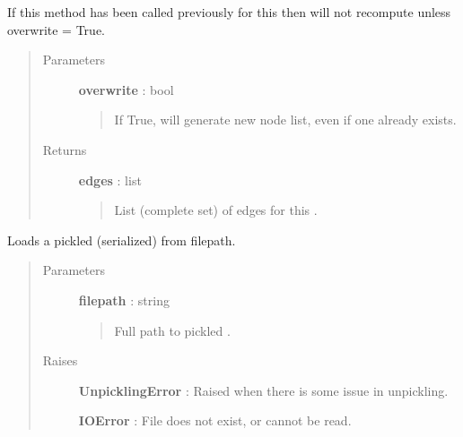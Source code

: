 \documentclass[letterpaper,10pt,english]{sphinxmanual}
\begin{document}
\begin{fulllineitems}
\begin{fulllineitems}
If this method has been called previously for this
{\hyperref[tethne:tethne.data.GraphCollection]{}} then will not recompute unless overwrite =
True.
\begin{quote}\begin{description}
\item[{Parameters }] \leavevmode
\textbf{overwrite} : bool
\begin{quote}

If True, will generate new node list, even if one already exists.
\end{quote}

\item[{Returns }] \leavevmode
\textbf{edges} : list
\begin{quote}

List (complete set) of edges for this {\hyperref[tethne:tethne.data.GraphCollection]{}} .
\end{quote}

\end{description}\end{quote}

\end{fulllineitems}


\begin{fulllineitems}
\label{tethne:tethne.data.GraphCollection.load}
Loads a pickled (serialized) {\hyperref[tethne:tethne.data.GraphCollection]{}} from filepath.
\begin{quote}\begin{description}
\item[{Parameters }] \leavevmode
\textbf{filepath} : string
\begin{quote}

Full path to pickled {\hyperref[tethne:tethne.data.GraphCollection]{}} .
\end{quote}

\item[{Raises }] \leavevmode
\textbf{UnpicklingError} : Raised when there is some issue in unpickling.

\textbf{IOError} : File does not exist, or cannot be read.

\end{description}\end{quote}


\end{fulllineitems}
\end{fulllineitems}
\end{document}
